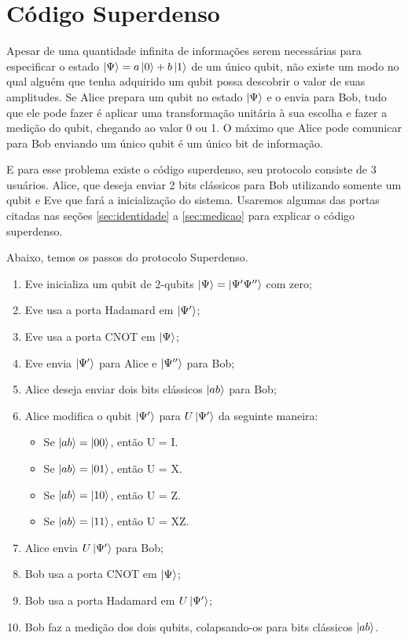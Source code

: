 \documentclass[a4paper, 12pt, oneside]{book}
\begin{document}
\section{Código Superdenso} \label{sec:superdenso}

Apesar de uma quantidade infinita de informações serem necessárias para especificar o estado $\ket{\Psi}=a\ket{0}+b\ket{1}$ de um único qubit, não existe um modo no qual alguém que tenha adquirido um qubit possa descobrir o valor de suas amplitudes. Se Alice prepara um qubit no estado $\ket{\Psi}$ e o envia para Bob, tudo que ele pode fazer é aplicar uma transformação unitária à sua escolha e fazer a medição do qubit, chegando ao valor 0 ou 1. O máximo que Alice pode comunicar para Bob enviando um único qubit é um único bit de informação.

E para esse problema existe o código superdenso, seu protocolo consiste de 3 usuários. Alice, que deseja enviar 2 bits clássicos para Bob utilizando somente um qubit e Eve que fará a inicialização do sistema. Usaremos algumas das portas citadas nas seções \ref{sec:identidade} a \ref{sec:medicao} para explicar o código superdenso.

Abaixo, temos os passos do protocolo Superdenso.
\begin{enumerate}
\item Eve inicializa um qubit de 2-qubits $\ket{\Psi} = \ket{\Psi'\Psi''}$ com zero;
\item Eve usa a porta Hadamard em $\ket{\Psi'}$;
\item Eve usa a porta CNOT em $\ket{\Psi}$;
\item Eve envia $\ket{\Psi'}$ para Alice e $\ket{\Psi''}$ para Bob;
\item Alice deseja enviar dois bits clássicos $\ket{ab}$ para Bob;
\item Alice modifica o qubit $\ket{\Psi'}$ para $U\ket{\Psi'}$ da seguinte maneira:
	\begin{itemize}
	\item Se $\ket{ab}=\ket{00}$, então U = I.
	\item Se $\ket{ab}=\ket{01}$, então U = X.
	\item Se $\ket{ab}=\ket{10}$, então U = Z.
	\item Se $\ket{ab}=\ket{11}$, então U = XZ.
	\end{itemize}
\item Alice envia $U\ket{\Psi'}$ para Bob;
\item Bob usa a porta CNOT em $\ket{\Psi}$;
\item Bob usa a porta Hadamard em $U\ket{\Psi'}$;
\item Bob faz a medição dos dois qubits, colapsando-os para bits clássicos $\ket{ab}$.
\end{enumerate}
\end{document}
